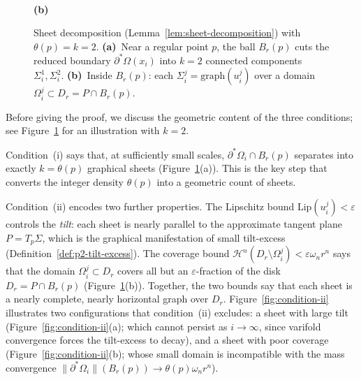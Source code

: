 \begin{figure}[ht]
\begin{minipage}[b]{0.38\textwidth}
\\[4pt]
      \textbf{(b)}
    \end{minipage}
    \caption{Sheet decomposition (Lemma~\ref{lem:sheet-decomposition}) with $\theta(p) = k = 2$. \textbf{(a)}~Near a regular point $p$, the ball $B_r(p)$ cuts the reduced boundary $\partial^*\Omega(x_i)$ into $k = 2$ connected components $\Sigma_i^1, \Sigma_i^2$. \textbf{(b)}~Inside $B_r(p)$: each $\Sigma_i^j = \mathrm{graph}(u_i^j)$ over a domain $\Omega_i^j \subset D_r = P \cap B_r(p)$.}
    \label{fig:sheet-decomposition}
\end{figure}

Before giving the proof, we discuss the geometric content of the three conditions; see Figure~\ref{fig:sheet-decomposition} for an illustration with $k = 2$.

Condition~(i) says that, at sufficiently small scales, $\partial^*\Omega_i \cap B_r(p)$ separates into exactly $k = \theta(p)$ graphical sheets (Figure~\ref{fig:sheet-decomposition}(a)). This is the key step that converts the integer density $\theta(p)$ into a geometric count of sheets.

Condition~(ii) encodes two further properties. The Lipschitz bound $\mathrm{Lip}(u_i^j) < \varepsilon$ controls the \emph{tilt}: each sheet is nearly parallel to the approximate tangent plane $P = T_p\Sigma$, which is the graphical manifestation of small tilt-excess (Definition~\ref{def:p2-tilt-excess}). The coverage bound $\mathcal{H}^n(D_r \setminus \Omega_i^j) < \varepsilon \omega_n r^n$ says that the domain $\Omega_i^j \subset D_r$ covers all but an $\varepsilon$-fraction of the disk $D_r = P \cap B_r(p)$ (Figure~\ref{fig:sheet-decomposition}(b)). Together, the two bounds say that each sheet is a nearly complete, nearly horizontal graph over $D_r$. Figure~\ref{fig:condition-ii} illustrates two configurations that condition~(ii) excludes: a sheet with large tilt (Figure~\ref{fig:condition-ii}(a); which cannot persist as $i \to \infty$, since varifold convergence forces the tilt-excess to decay), and a sheet with poor coverage (Figure~\ref{fig:condition-ii}(b); whose small domain is incompatible with the mass convergence $\|\partial^*\Omega_i\|(B_r(p)) \to \theta(p)\omega_n r^n$).

